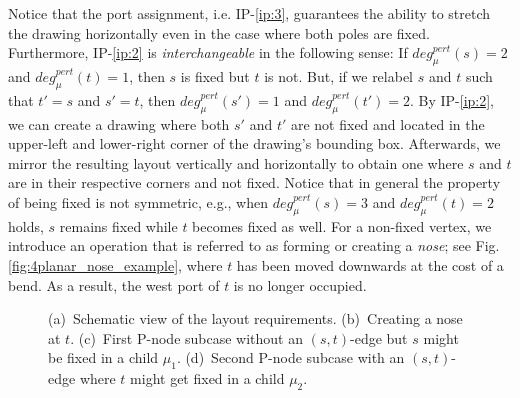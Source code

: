 \documentclass[a4paper,twoside,11pt]{article}
\newcommand{\pdeg}[2]{\textit{deg}^{\textit{pert}}_{#1}(#2)}
\newcommand{\IPFix}{IP-\ref{ip:2}\xspace}
\newcommand{\IPPort}{IP-\ref{ip:3}\xspace}
\begin{document}
Notice that the port assignment, i.e. \IPPort, guarantees the
ability to stretch the drawing horizontally even in the case where
both poles are fixed. Furthermore, \IPFix is \emph{interchangeable}
in the following sense: If $\pdeg{\mu}{s} = 2$ and $\pdeg{\mu}{t} =
1$, then $s$ is fixed but $t$ is not. But, if we relabel $s$ and $t$
such that $t'= s$ and $s' = t$, then $\pdeg{\mu}{s'} = 1$ and
$\pdeg{\mu}{t'} = 2$. By \IPFix, we can create a drawing where both
$s'$ and $t'$ are not fixed and located in the upper-left and
lower-right corner of the drawing's bounding box. Afterwards, we
mirror the resulting layout vertically and horizontally to obtain
one where $s$ and $t$ are in their respective corners and not fixed.
Notice that in general the property of being fixed is not symmetric,
e.g., when $\pdeg{\mu}{s} = 3$ and $\pdeg{\mu}{t} = 2$ holds, $s$
remains fixed while $t$ becomes fixed as well. For a non-fixed
vertex, we introduce an operation that is referred to as forming or
creating a \emph{nose}; see Fig.\ref{fig:4planar_nose_example},
where $t$ has been moved downwards at the cost of a bend. As a
result, the west port of $t$ is no longer occupied.

\begin{figure}[t]
    \centering
    \begin{minipage}[b]{.24\textwidth}
        \centering
    \end{minipage}
    \hfill
    \begin{minipage}[b]{.24\textwidth}
        \centering
    \end{minipage}
    \hfill
    \begin{minipage}[b]{.24\textwidth}
        \centering
    \end{minipage}
    \hfill
    \begin{minipage}[b]{.24\textwidth}
        \centering
    \end{minipage}
    \caption{
    (a)~Schematic view of the layout requirements.
    (b)~Creating a nose at $t$.
    (c)~First P-node subcase without an $(s,t)$-edge but $s$ might be fixed in a child $\mu_1$.
    (d)~Second P-node subcase with an $(s,t)$-edge where $t$ might get fixed in a child $\mu_2$.}
    \label{fig:4p_requirements}
\end{figure}
\end{document}
